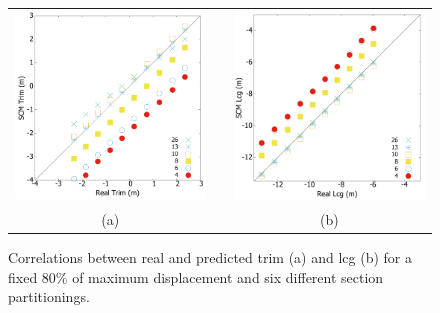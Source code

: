 \documentclass[runningheads]{llncs}
\begin{document}
\begin{figure}[h!]
\begin{center}
 \begin{tabular}{ccc}
  \includegraphics[scale=0.15]{figures/TrimVarSec} & & \includegraphics[scale=0.15]{figures/LcgVarSec} \\
  (a) & \hspace{5mm} & (b)
\end{tabular}  
\end{center}
\caption{Correlations between real and predicted trim (a) and lcg (b) for a fixed 80\% of maximum displacement and six different section partitionings.}
\label{fig:trimLcgFixDisp}
\end{figure}
\end{document}
